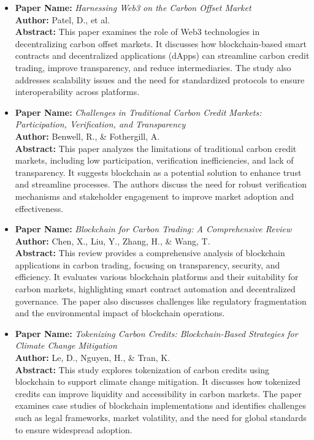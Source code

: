 \documentclass[oneside,a4paper,12pt]{book}
\begin{document}
\begin{itemize}
  \item \textbf{Paper Name:} \textit{Harnessing Web3 on the Carbon Offset Market} \\
        \textbf{Author:} Patel, D., et al. \\
        \textbf{Abstract:} This paper examines the role of Web3 technologies in decentralizing carbon offset markets. It discusses how blockchain-based smart contracts and decentralized applications (dApps) can streamline carbon credit trading, improve transparency, and reduce intermediaries. The study also addresses scalability issues and the need for standardized protocols to ensure interoperability across platforms.

  \item \textbf{Paper Name:} \textit{Challenges in Traditional Carbon Credit Markets: Participation, Verification, and Transparency} \\
        \textbf{Author:} Benwell, R., \& Fothergill, A. \\
        \textbf{Abstract:} This paper analyzes the limitations of traditional carbon credit markets, including low participation, verification inefficiencies, and lack of transparency. It suggests blockchain as a potential solution to enhance trust and streamline processes. The authors discuss the need for robust verification mechanisms and stakeholder engagement to improve market adoption and effectiveness.

  \item \textbf{Paper Name:} \textit{Blockchain for Carbon Trading: A Comprehensive Review} \\
        \textbf{Author:} Chen, X., Liu, Y., Zhang, H., \& Wang, T. \\
        \textbf{Abstract:} This review provides a comprehensive analysis of blockchain applications in carbon trading, focusing on transparency, security, and efficiency. It evaluates various blockchain platforms and their suitability for carbon markets, highlighting smart contract automation and decentralized governance. The paper also discusses challenges like regulatory fragmentation and the environmental impact of blockchain operations.

  \item \textbf{Paper Name:} \textit{Tokenizing Carbon Credits: Blockchain-Based Strategies for Climate Change Mitigation} \\
        \textbf{Author:} Le, D., Nguyen, H., \& Tran, K. \\
        \textbf{Abstract:} This study explores tokenization of carbon credits using blockchain to support climate change mitigation. It discusses how tokenized credits can improve liquidity and accessibility in carbon markets. The paper examines case studies of blockchain implementations and identifies challenges such as legal frameworks, market volatility, and the need for global standards to ensure widespread adoption.


\end{itemize}
\end{document}
